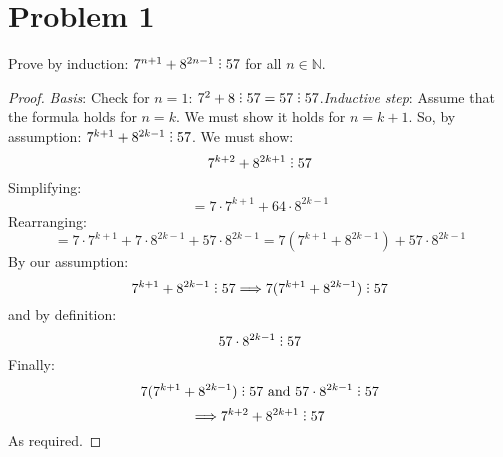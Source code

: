 \documentclass[12pt]{article}
\title{\scalebox{2}{Math 341 Exam 1}}
\author{\scalebox{1.5}{Theo Koss}}
\date{September 2020}
\newcommand{\N}{\mathbb{N}}
\newcommand{\divby}{%
  \mathrel{\text{\vbox{\baselineskip.65ex\lineskiplimit0pt\hbox{.}\hbox{.}\hbox{.}}}}%
  }
\begin{document}
\maketitle
\section{Problem 1}
Prove by induction: $7^{n+1}+8^{2n-1}\divby57$ for all $n\in\N$.
\begin{proof}
\emph{Basis}: Check for $n=1$: $7^2+8\divby57=57\divby57$.\newline \emph{Inductive step}: Assume that the formula holds for $n=k$. We must show it holds for $n=k+1$. So, by assumption: $7^{k+1}+8^{2k-1}\divby57$. We must show: $$7^{k+2}+8^{2k+1}\divby57$$ Simplifying:$$=7\cdot7^{k+1}+64\cdot8^{2k-1}$$ Rearranging:$$=7\cdot7^{k+1}+7\cdot8^{2k-1}+57\cdot8^{2k-1}=7(7^{k+1}+8^{2k-1})+57\cdot8^{2k-1}$$By our assumption:$$7^{k+1}+8^{2k-1}\divby57\Longrightarrow 7(7^{k+1}+8^{2k-1})\divby57$$ and by definition:$$57\cdot8^{2k-1}\divby57$$ Finally:$$7(7^{k+1}+8^{2k-1})\divby57\text{ and } 57\cdot8^{2k-1}\divby57$$ $$\Longrightarrow 7^{k+2}+8^{2k+1}\divby57$$ As required.
\end{proof}
\end{document}
